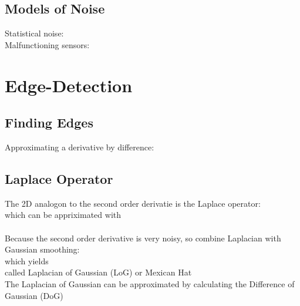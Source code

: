 \documentclass[a4paper,12pt,pdftex]{scrreprt}
\begin{document}
	\section{Models of Noise} %
	\label{sec:models_of_noise}
	Statistical noise: \\
	Malfunctioning sensors: 

	\chapter{Edge-Detection} %
	\label{cha:edge_detection}
	
	\section{Finding Edges} %
	\label{sec:finding_edges}
	Approximating a derivative by difference:

	\section{Laplace Operator} %
	\label{sec:laplace_operator}
	The 2D analogon to the second order derivatie is the Laplace operator:\\
	 which can be appriximated with\\
	\\
	Because the second order derivative is very noisy, so combine Laplacian with Gaussian smoothing:\\
	 which yields \\
	 called Laplacian of Gaussian (LoG) or Mexican Hat\\
	The Laplacian of Gaussian can be approximated by calculating the Difference of Gaussian (DoG)\\
	
\end{document}
